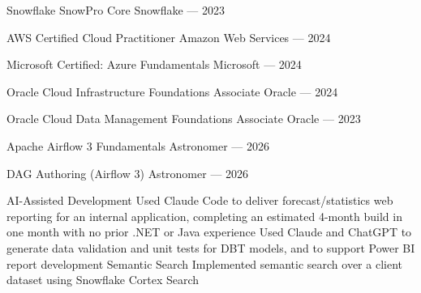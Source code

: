 


\begin{cvskillsnoncentered}

\cvskill
    {Snowflake SnowPro Core}
    {Snowflake --- 2023}

\cvskill
    {AWS Certified Cloud Practitioner}
    {Amazon Web Services --- 2024}

\cvskill
    {Microsoft Certified: Azure Fundamentals}
    {Microsoft --- 2024}

\cvskill
    {Oracle Cloud Infrastructure Foundations Associate}
    {Oracle --- 2024}

\cvskill
    {Oracle Cloud Data Management Foundations Associate}
    {Oracle --- 2023}

\cvskill
    {Apache Airflow 3 Fundamentals}
    {Astronomer --- 2026}

\cvskill
    {DAG Authoring (Airflow 3)}
    {Astronomer --- 2026}

\end{cvskillsnoncentered}


\begin{cvskillsnoncentered}

\cvskill
    {AI-Assisted Development}
    {Used Claude Code to deliver forecast/statistics web reporting for an internal application, completing an estimated 4-month build in one month with no prior .NET or Java experience}
\cvskill
    {}
    {Used Claude and ChatGPT to generate data validation and unit tests for DBT models, and to support Power BI report development}
\cvskill
    {Semantic Search}
    {Implemented semantic search over a client dataset using Snowflake Cortex Search}

\end{cvskillsnoncentered}